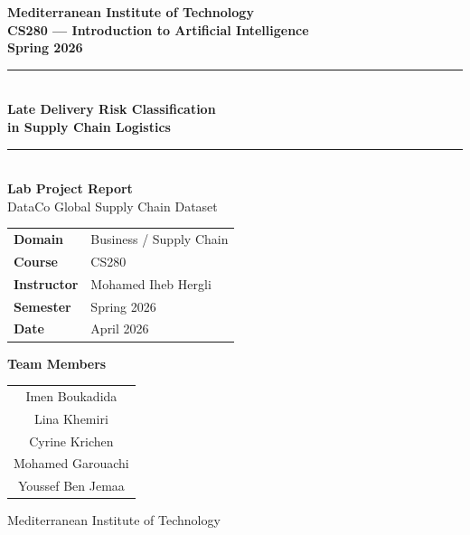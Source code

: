 \documentclass[12pt,a4paper]{article}
\begin{document}
\begin{titlepage}
  \centering
  \vspace*{1.5cm}
  {\Large\bfseries Mediterranean Institute of Technology\\[4pt]
   \large CS280 --- Introduction to Artificial Intelligence\\[2pt]
   \normalsize Spring 2026}\\[2cm]

  \rule{\linewidth}{1.5pt}\\[0.4cm]
  {\LARGE\bfseries\color{mitblue}
    Late Delivery Risk Classification\\[6pt]
    in Supply Chain Logistics}\\[0.4cm]
  \rule{\linewidth}{1.5pt}\\[1.5cm]

  {\large\bfseries Lab Project Report}\\[0.5cm]
  {\normalsize DataCo Global Supply Chain Dataset}\\[2cm]

  \begin{tabular}{ll}
    \textbf{Domain}     & Business / Supply Chain \\[4pt]
    \textbf{Course}     & CS280 \\[4pt]
    \textbf{Instructor} & Mohamed Iheb Hergli \\[4pt]
    \textbf{Semester}   & Spring 2026 \\[4pt]
    \textbf{Date}       & April 2026 \\
  \end{tabular}

  \vspace{1.5cm}
  {\normalsize\bfseries Team Members}\\[0.5cm]
  \begin{tabular}{c}
    Imen Boukadida \\[3pt]
    Lina Khemiri \\[3pt]
    Cyrine Krichen \\[3pt]
    Mohamed Garouachi \\[3pt]
    Youssef Ben Jemaa \\
  \end{tabular}

  \vfill
  {\normalsize Mediterranean Institute of Technology}
\end{titlepage}

\tableofcontents
\newpage
\end{document}
